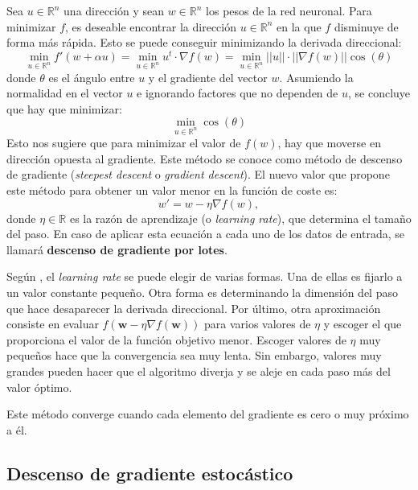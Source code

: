 Sea $u \in \mathbb{R}^n$ una dirección y sean $w \in \mathbb{R}^n$ los pesos de la red neuronal. Para minimizar $f$, es deseable encontrar la dirección $u \in \mathbb{R}^n$ en la que $f$ disminuye de forma más rápida. Esto se puede conseguir minimizando la derivada direccional:
\begin{equation}
    \min_{u \in \mathbb{R}^n} f'(w + \alpha u) = \min_{u \in \mathbb{R}^n} u^t \cdot \nabla f(w) = \min_{u \in \mathbb{R}^n} ||u|| \cdot ||\nabla f(w)|| \cos(\theta)
\end{equation}
donde $\theta$ es el ángulo entre $u$ y el gradiente del vector $w$. Asumiendo la normalidad en el vector $u$ e ignorando factores que no dependen de $u$, se concluye que hay que minimizar:
\begin{equation}
    \min_{u \in \mathbb{R}^n} \cos(\theta)
\end{equation}
Esto nos sugiere que para minimizar el valor de $f(w)$, hay que moverse en dirección opuesta al gradiente. Este método se conoce como método de descenso de gradiente (\textit{steepest descent} o \textit{gradient descent}). El nuevo valor que propone este método para obtener un valor menor en la función de coste es:
\begin{equation} \label{eq: actuPesos}
    w' = w - \eta \nabla f(w),
\end{equation} 
donde $\eta \in \mathbb{R}$ es la razón de aprendizaje (o \textit{learning rate}), que determina el tamaño del paso. En caso de aplicar esta ecuación a cada uno de los datos de entrada, se llamará \textbf{descenso de gradiente por lotes}. 

Según \citep{pajares2021aprendizaje}, el \textit{learning rate} se puede elegir de varias formas. Una de ellas es fijarlo a un valor constante pequeño. Otra forma es determinando la dimensión del paso que hace desaparecer la derivada direccional. Por último, otra aproximación consiste en evaluar $f(\mathbf{w} - \eta \nabla f(\mathbf{w}))$ para varios valores de $\eta$ y escoger el que proporciona el valor de la función objetivo menor. Escoger valores de $\eta$ muy pequeños hace que la convergencia sea muy lenta. Sin embargo, valores muy grandes pueden hacer que el algoritmo diverja y se aleje en cada paso más del valor óptimo.

Este método converge cuando cada elemento del gradiente es cero o muy próximo a él.  


\subsection{Descenso de gradiente estocástico}

